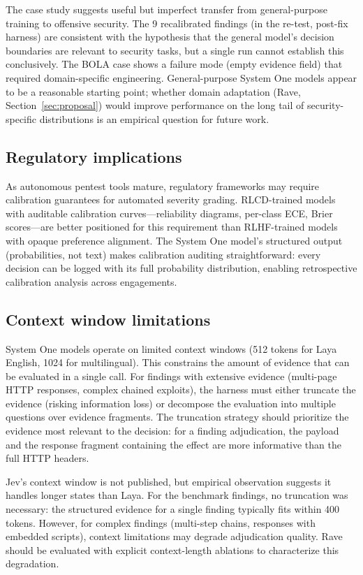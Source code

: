 \documentclass[conference]{IEEEtran}
\begin{document}
The case study suggests useful but imperfect transfer from general-purpose training to offensive security. The 9 recalibrated findings (in the re-test, post-fix harness) are consistent with the hypothesis that the general model's decision boundaries are relevant to security tasks, but a single run cannot establish this conclusively. The BOLA case shows a failure mode (empty evidence field) that required domain-specific engineering. General-purpose System One models appear to be a reasonable starting point; whether domain adaptation (Rave, Section~\ref{sec:proposal}) would improve performance on the long tail of security-specific distributions is an empirical question for future work.

\subsection{Regulatory implications}

As autonomous pentest tools mature, regulatory frameworks may require calibration guarantees for automated severity grading. RLCD-trained models with auditable calibration curves---reliability diagrams, per-class ECE, Brier scores---are better positioned for this requirement than RLHF-trained models with opaque preference alignment. The System One model's structured output (probabilities, not text) makes calibration auditing straightforward: every decision can be logged with its full probability distribution, enabling retrospective calibration analysis across engagements.

\subsection{Context window limitations}

System One models operate on limited context windows (512 tokens for Laya English, 1024 for multilingual). This constrains the amount of evidence that can be evaluated in a single call. For findings with extensive evidence (multi-page HTTP responses, complex chained exploits), the harness must either truncate the evidence (risking information loss) or decompose the evaluation into multiple questions over evidence fragments. The truncation strategy should prioritize the evidence most relevant to the decision: for a finding adjudication, the payload and the response fragment containing the effect are more informative than the full HTTP headers.

Jev's context window is not published, but empirical observation suggests it handles longer states than Laya. For the benchmark findings, no truncation was necessary: the structured evidence for a single finding typically fits within 400 tokens. However, for complex findings (multi-step chains, responses with embedded scripts), context limitations may degrade adjudication quality. Rave should be evaluated with explicit context-length ablations to characterize this degradation.
\end{document}
